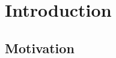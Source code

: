 \doublespacing %

\chapter{Introduction}
\label{ch1}

\begin{spacing}{1} %
\minitoc %
\end{spacing} %
\thesisspacing %

\section{Motivation}

